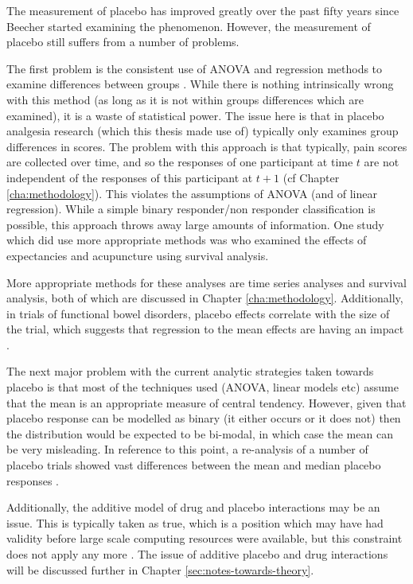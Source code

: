 The measurement of placebo has improved greatly over the past fifty years since Beecher started examining the phenomenon. However, the measurement of placebo still suffers from a number of problems.

The first problem is the consistent use of ANOVA and regression methods to examine differences between groups \cite{Colloca2008b,Pollo2001}. While there is nothing intrinsically wrong with this method (as long as it is not within groups differences which are examined), it is a waste of statistical power. The issue here is that in placebo analgesia research (which this thesis made use of) typically only examines group differences in scores. The problem with this approach is that typically, pain scores are collected over time, and so the responses of one participant at time $t$ are not independent of the responses of this participant at $t+1$ (cf Chapter \ref{cha:methodology}). This violates the assumptions of ANOVA (and of linear regression). While a simple binary responder/non responder classification is possible, this approach throws away large amounts of information. One study which did use more appropriate methods was \cite{Bausell2005} who examined the effects of expectancies and acupuncture using survival analysis. 

More appropriate methods for these analyses are time series analyses and survival analysis, both of which are discussed in Chapter \ref{cha:methodology}. Additionally, in trials of functional bowel disorders, placebo effects correlate with the size of the trial, which suggests that regression to the mean effects are having an impact \cite{Enck2005a}. 

The next major problem with the current analytic strategies taken towards placebo is that most of the techniques used (ANOVA, linear models etc) assume that the mean is an appropriate measure of central tendency. However, given that placebo response can be modelled as binary (it either occurs or it does not) then the distribution would be expected to be bi-modal, in which case the mean can be very misleading. In reference to this point, a re-analysis of a number of placebo trials showed vast differences between the mean and median placebo responses \cite{McQuay1996}. 

Additionally, the additive model of drug and placebo interactions may be an issue. This is typically taken as true, which is a position which may have had validity before large scale computing resources were available, but this constraint does not apply any more \cite{Caspi2002}. The issue of additive placebo and drug interactions will be discussed further in Chapter \ref{sec:notes-towards-theory}. 


